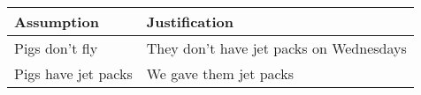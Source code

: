 \begin{table}[h]
\centering
\begin{tabular}{l l}
\toprule[1pt] \textbf{Assumption} & \textbf{Justification}\\\midrule[0.5pt]
Pigs don't fly & They don't have jet packs on Wednesdays\\
Pigs have jet packs & We gave them jet packs\\
\bottomrule[1pt]
\end{tabular}
\end{table}